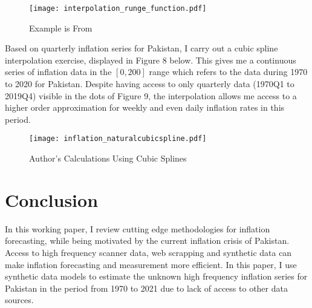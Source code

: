 \documentclass[12pt]{article}
\newcommand{\1}{\mathbbm 1}
\begin{document}
		
		
		
		
		
		
		\begin{figure}[H]
			\begin{Center}
				\texttt{[image: interpolation\_runge\_function.pdf]}
				\caption{Example is From \cite{okten2019first}}
			\end{Center}
		\end{figure}
		
		
		Based on quarterly inflation series for Pakistan, I carry out a cubic spline interpolation exercise, displayed in Figure 8 below. This gives me a continuous series of inflation data in the $[0,200]$ range which refers to the data during 1970 to 2020 for Pakistan. Despite having access to only quarterly data (1970Q1 to 2019Q4) visible in the dots of Figure 9, the interpolation allows me access to a higher order approximation for weekly and even daily inflation rates in this period. 
		
		
		
		
		
		\begin{figure}[H]
			\begin{Center}
				\texttt{[image: inflation\_naturalcubicspline.pdf]}
				\caption{Author's Calculations Using Cubic Splines}
			\end{Center}
		\end{figure}
		
		
		
		
		
		
		
		
		
		
		
		
		
		
		
		
		
		
		\section{Conclusion}
		
		In this working paper, I review cutting edge methodologies for inflation forecasting, while being motivated by the current inflation crisis of Pakistan. Access to high frequency scanner data, web scrapping and synthetic data can make inflation forecasting and measurement more efficient. In this paper, I use synthetic data models to estimate the unknown high frequency inflation series for Pakistan in the period from 1970 to 2021 due to lack of access to other data sources.
		
\end{document}
